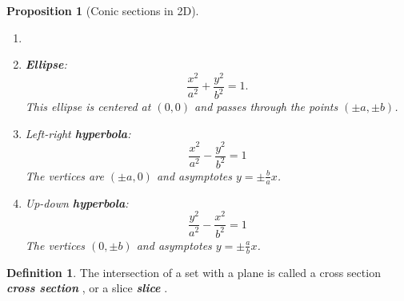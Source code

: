 \documentclass[10pt]{article}
\DeclareRobustCommand{\demph}[1]{%
  \ifmmode
  {\color{Blue}#1}%
  \else
  {\color{Blue}\bfseries\slshape #1}%
  \fi
}
\newtheorem{proposition}[theorem]{Proposition}
\theoremstyle{definition}
\newtheorem{definition}[theorem]{Definition}
\newcommand{\1}[1]{\textbf{1}_{\left[#1\right]}} %
\begin{document}
\begin{proposition}[Conic sections in 2D]
  \label{prop:conic-sections-2d}
  \begin{enumerate}
    \item[]
    \item \textbf{Ellipse}:
    \begin{equation*}
      \frac{x^{2}}{a^{2}}+\frac{y^{2}}{b^{2}} =1.
    \end{equation*}
    This ellipse is centered at $(0,0)$ and passes through the points $(\pm
    a,\pm b)$.
    \item Left-right \textbf{hyperbola}:
    \begin{equation*}
      \frac{x^{2}}{a^{2}}-\frac{y^{2}}{b^{2}}=1
    \end{equation*}
    The vertices are $(\pm a,0)$ and asymptotes $y=\pm\frac{b}{a}x$.
    \item Up-down \textbf{hyperbola}:
    \begin{equation*}
      \frac{y^{2}}{a^{2}}-\frac{x^{2}}{b^{2}}=1
    \end{equation*}
    The vertices $(0,\pm b)$ and asymptotes $y=\pm \frac{a}{b}x$.
  \end{enumerate}
\end{proposition}

\begin{definition}
  The intersection of a set with a plane is called a \demph{cross section}, or a \demph{slice}.
\end{definition}
\end{document}
